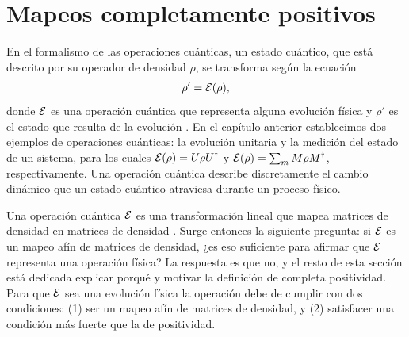 \section{Mapeos completamente positivos} %
En el formalismo de las operaciones cuánticas, un estado cuántico,
que está descrito por su operador de densidad $\rho$,
se transforma según la ecuación 
\begin{align}
\rho' = \mathcal{E} (\rho)
\label{eq:E(rho)},
\end{align} 
donde $\mathcal{E}$ es una operación cuántica que representa alguna evolución 
física y $\rho'$ es el estado que resulta de la evolución 
\cite{nielsen_chuang_2011}. 
En el capítulo anterior  establecimos 
dos ejemplos de operaciones cuánticas: la evolución unitaria 
y la medición del estado de un sistema, 
para los cuales $\mathcal{E} \qty(\rho)=U\rho U^{\dagger}$ y 
$\mathcal{E}(\rho)=\sum_mM\rho M^{\dagger}$, respectivamente. 
Una operación cuántica describe discretamente 
el cambio dinámico que un estado cuántico 
atraviesa durante un proceso físico. 

Una operación cuántica $\mathcal{E}$ es
una transformación lineal que mapea matrices de densidad en matrices 
de densidad \cite{bengtsson_zyczkowski_2017}. Surge entonces la siguiente
pregunta: si $\mathcal{E}$ es un mapeo afín de matrices de densidad, ¿es eso
suficiente para afirmar que $\mathcal{E}$ representa una operación física? 
La respuesta es que no, y el resto de esta sección está dedicada
explicar porqué y motivar la definición de completa positividad.  
Para que $\mathcal{E}$ sea una evolución física la operación debe de cumplir con dos
condiciones: (1) ser un mapeo afín de matrices de densidad, 
y (2) satisfacer una condición más fuerte que la de positividad. 

